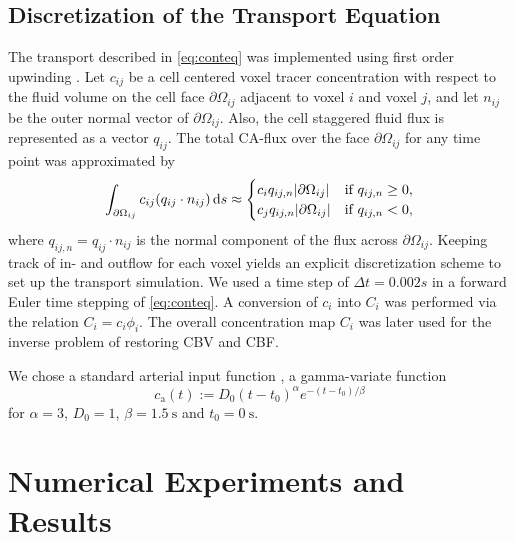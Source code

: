 \documentclass[paper=a4, fontsize=11pt,parskip=half,headings=small]{scrartcl}
\newcommand{\ca}{c_\mathrm{a}}
\begin{document}
	\subsection{Discretization of the Transport Equation} \label{sec:numtrans}
	The transport described in \eqref{eq:conteq} was implemented using first order upwinding \cite{Patankar80}.
	Let $c_{ij}$ be a cell centered voxel tracer concentration with respect to the fluid volume on the cell face $\partial \Omega_{ij}$ adjacent to voxel $i$ and voxel $j$, and let $n_{ij}$ be the outer normal vector of $\partial \Omega_{ij}$. Also, the cell staggered fluid flux is represented as a vector $q_{ij}$.
	The total CA-flux over the face $\partial \Omega_{ij}$ for any time point was approximated by
	\begin{equation}
	\int_{\partial \Omega_{ij}} c_{ij} (q_{ij}\cdot n_{ij}) \,\mathrm{d} s \approx
	\begin{cases}
	c_i q_{ij,n} \vert \partial \Omega_{ij} \vert & \text{if } q_{ij,n} \geq 0,\\
	c_j q_{ij,n} \vert \partial \Omega_{ij} \vert & \text{if } q_{ij,n} < 0,
	\end{cases}
	\end{equation}
	where $q_{ij,n} = q_{ij} \cdot n_{ij}$ is the normal component of the flux across $\partial \Omega_{ij}$.
	Keeping track of in- and outflow for each voxel yields an explicit discretization scheme to set up the transport simulation. We used a time step of $\Delta t = 0.002 s$ in a forward Euler time stepping of \eqref{eq:conteq}.
	A conversion of $c_i$ into $C_i$ was performed via the relation $C_i = c_i\phi_i$. The overall concentration map $C_i$ was later used for the inverse problem of restoring CBV and CBF.

	We chose a standard arterial input function \cite{ostergaard96}, a gamma-variate \cite{chan04} function
	\begin{equation}
		\ca(t) := D_0(t-t_0)^\alpha e^{-(t-t_0)/\beta}
	\end{equation}
	for $\alpha=3$, $D_0 = 1$, $\beta = \SI{1.5}{\second}$ and $t_0 = \SI{0}{\second}$.






	\section{Numerical Experiments and Results}\label{sec:NumExp}
\end{document}
